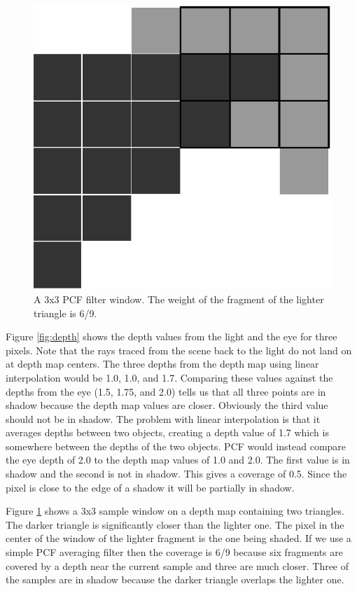 \documentclass[12pt]{article}
\begin{document}
\begin{figure}
\centering
\includegraphics[scale=0.5]{pcf.eps}
\caption{\label{fig:pcf} A 3x3 PCF filter window. The weight of the fragment of the lighter triangle is 6/9.}
\end{figure}

Figure \ref{fig:depth} shows the depth values from the light and the eye for three pixels. Note that the rays traced from the scene back to the light do not land on at depth map centers. The three depths from the depth map using linear interpolation would be 1.0, 1.0, and 1.7. Comparing these values against the depths from the eye (1.5, 1.75, and 2.0) tells us that all three points are in shadow because the depth map values are closer.
Obviously the third value should not be in shadow. The problem with linear interpolation is that it averages depths between two objects, creating a depth value of 1.7 which is somewhere between the depths of the two objects.
PCF would instead compare the eye depth of 2.0 to the depth map values of 1.0 and 2.0. The first value is in shadow and the second is not in shadow. This gives a coverage of 0.5.
Since the pixel is close to the edge of a shadow it will be partially in shadow.

Figure \ref{fig:pcf} shows a 3x3 sample window on a depth map containing two triangles. The darker triangle is significantly closer than the lighter one. The pixel in the center of the window of the lighter fragment is the one being shaded. If we use a simple PCF averaging filter then the coverage is 6/9 because six fragments are covered by a depth near the current sample and three are much closer. Three of the samples are in shadow because the darker triangle overlaps the lighter one.
\end{document}

